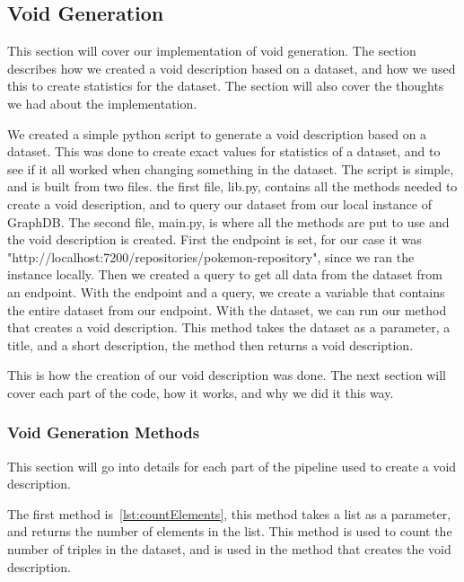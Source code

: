 \subsection{Void Generation}\label{sec:void}

This section will cover our implementation of void generation. The section describes how we created a void description based on a dataset, and how we used this to create statistics for the dataset. The section will also cover the thoughts we had about the implementation.

We created a simple python script to generate a void description based on a dataset. This was done to create exact values for statistics of a dataset, and to see if it all worked when changing something in the dataset. The script is simple, and is built from two files. the first file, lib.py, contains all the methods needed to create a void description, and to query our dataset from our local instance of GraphDB. The second file, main.py, is where all the methods are put to use and the void description is created. First the endpoint is set, for our case it was "http://localhost:7200/repositories/pokemon-repository", since we ran the instance locally. Then we created a query to get all data from the dataset from an endpoint. With the endpoint and a query, we create a variable that contains the entire dataset from our endpoint. With the dataset, we can run our method that creates a void description. This method takes the dataset as a parameter, a title, and a short description, the method then returns a void description.

This is how the creation of our \gls{void} description was done. The next section will cover each part of the code, how it works, and why we did it this way.

\subsubsection{Void Generation Methods}\label{sec:voidmethods}
This section will go into details for each part of the pipeline used to create a void description.

The first method is~\ref{lst:countElements}, this method takes a list as a parameter, and returns the number of elements in the list. This method is used to count the number of triples in the dataset, and is used in the method that creates the void description.

